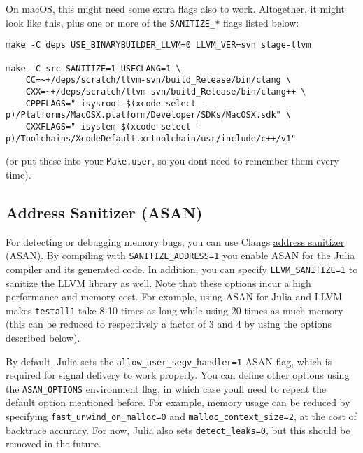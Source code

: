 On macOS, this might need some extra flags also to work. Altogether, it might look like this, plus one or more of the \texttt{SANITIZE\_*} flags listed below:




\begin{lstlisting}
make -C deps USE_BINARYBUILDER_LLVM=0 LLVM_VER=svn stage-llvm

make -C src SANITIZE=1 USECLANG=1 \
    CC=~+/deps/scratch/llvm-svn/build_Release/bin/clang \
    CXX=~+/deps/scratch/llvm-svn/build_Release/bin/clang++ \
    CPPFLAGS="-isysroot $(xcode-select -p)/Platforms/MacOSX.platform/Developer/SDKs/MacOSX.sdk" \
    CXXFLAGS="-isystem $(xcode-select -p)/Toolchains/XcodeDefault.xctoolchain/usr/include/c++/v1"
\end{lstlisting}



(or put these into your \texttt{Make.user}, so you don{\textquotesingle}t need to remember them every time).



\hypertarget{1061650975116506198}{}


\subsection{Address Sanitizer (ASAN)}



For detecting or debugging memory bugs, you can use Clang{\textquotesingle}s \href{https://clang.llvm.org/docs/AddressSanitizer.html}{address sanitizer (ASAN)}. By compiling with \texttt{SANITIZE\_ADDRESS=1} you enable ASAN for the Julia compiler and its generated code. In addition, you can specify \texttt{LLVM\_SANITIZE=1} to sanitize the LLVM library as well. Note that these options incur a high performance and memory cost. For example, using ASAN for Julia and LLVM makes \texttt{testall1} take 8-10 times as long while using 20 times as much memory (this can be reduced to respectively a factor of 3 and 4 by using the options described below).



By default, Julia sets the \texttt{allow\_user\_segv\_handler=1} ASAN flag, which is required for signal delivery to work properly. You can define other options using the \texttt{ASAN\_OPTIONS} environment flag, in which case you{\textquotesingle}ll need to repeat the default option mentioned before. For example, memory usage can be reduced by specifying \texttt{fast\_unwind\_on\_malloc=0} and \texttt{malloc\_context\_size=2}, at the cost of backtrace accuracy. For now, Julia also sets \texttt{detect\_leaks=0}, but this should be removed in the future.



